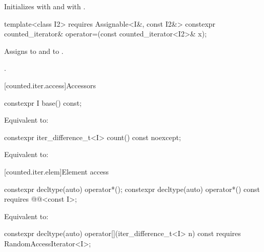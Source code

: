\begin{itemdescr}
\pnum
\effects
Initializes  with  and
 with .
\end{itemdescr}

%
\begin{itemdecl}
template<class I2>
  requires Assignable<I&, const I2&>
    constexpr counted_iterator& operator=(const counted_iterator<I2>& x);
\end{itemdecl}

\begin{itemdescr}
\pnum
\effects
Assigns  to  and
 to .

\pnum
\returns {}.
\end{itemdescr}

[counted.iter.access]{Accessors}

%
\begin{itemdecl}
constexpr I base() const;
\end{itemdecl}

\begin{itemdescr}
\pnum
\effects Equivalent to: 
\end{itemdescr}

%
\begin{itemdecl}
constexpr iter_difference_t<I> count() const noexcept;
\end{itemdecl}

\begin{itemdescr}
\pnum
\effects Equivalent to: 
\end{itemdescr}

[counted.iter.elem]{Element access}

%
\begin{itemdecl}
constexpr decltype(auto) operator*();
constexpr decltype(auto) operator*() const
  requires @@<const I>;
\end{itemdecl}

\begin{itemdescr}
\pnum
\effects Equivalent to: 
\end{itemdescr}

%
\begin{itemdecl}
constexpr decltype(auto) operator[](iter_difference_t<I> n) const
  requires RandomAccessIterator<I>;
\end{itemdecl}


